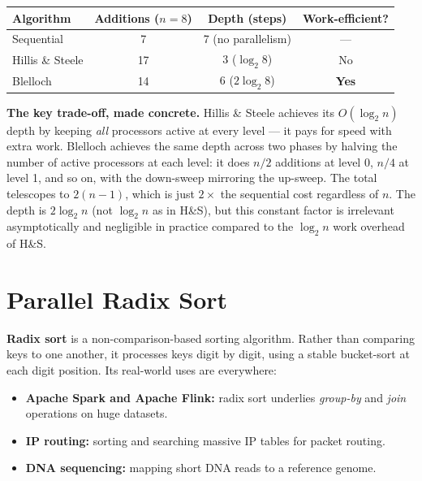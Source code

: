 \begin{center}
\renewcommand{\arraystretch}{1.3}
\begin{tabular}{lccc}
\toprule
\textbf{Algorithm} & \textbf{Additions ($n=8$)} & \textbf{Depth (steps)}
                   & \textbf{Work-efficient?} \\
\midrule
Sequential         & 7                   & 7 (no parallelism)    & --- \\
Hillis \& Steele   & 17                  & 3 ($\log_2 8$)        & No \\
Blelloch           & 14                  & 6 ($2\log_2 8$)       & \textbf{Yes} \\
\bottomrule
\end{tabular}
\end{center}

\begin{ppkey}
\textbf{The key trade-off, made concrete.}
Hillis \& Steele achieves its $O(\log_2 n)$ depth by keeping \emph{all}
processors active at every level --- it pays for speed with extra work.
Blelloch achieves the same depth across two phases by halving the number
of active processors at each level: it does $n/2$ additions at level 0,
$n/4$ at level 1, and so on, with the down-sweep mirroring the up-sweep.
The total telescopes to $2(n-1)$, which is just $2\times$ the sequential
cost regardless of $n$. The depth is $2\log_2 n$ (not $\log_2 n$ as in
H\&S), but this constant factor is irrelevant asymptotically and
negligible in practice compared to the $\log_2 n$ work overhead of H\&S.
\end{ppkey}

\section{Parallel Radix Sort}
\label{sec:radix-sort}

\textbf{Radix sort} is a non-comparison-based sorting algorithm. Rather
than comparing keys to one another, it processes keys digit by digit,
using a stable bucket-sort at each digit position. Its real-world uses
are everywhere:

\begin{itemize}[leftmargin=*]
  \item \textbf{Apache Spark and Apache Flink:} radix sort underlies
        \emph{group-by} and \emph{join} operations on huge datasets.
  \item \textbf{IP routing:} sorting and searching massive IP tables for
        packet routing.
  \item \textbf{DNA sequencing:} mapping short DNA reads to a reference
        genome.
\end{itemize}

